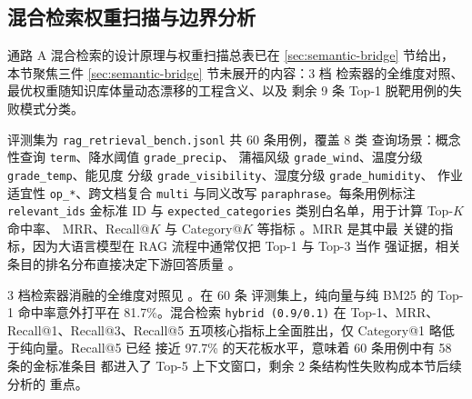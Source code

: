 ﻿%

\subsection{混合检索权重扫描与边界分析}
\label{sec:rag-eval}

通路 A 混合检索的设计原理与权重扫描总表已在 \ref{sec:semantic-bridge}
节给出，本节聚焦三件 \ref{sec:semantic-bridge} 节未展开的内容：3 档
检索器的全维度对照、最优权重随知识库体量动态漂移的工程含义、以及
剩余 9 条 Top-1 脱靶用例的失败模式分类。

评测集为 \texttt{rag\_\bk{}retrieval\_\bk{}bench.\bk{}jsonl} 共 60 条用例，覆盖 8 类
查询场景：概念性查询 \texttt{term}、降水阈值 \texttt{grade\_\bk{}precip}、
蒲福风级 \texttt{grade\_\bk{}wind}、温度分级 \texttt{grade\_\bk{}temp}、能见度
分级 \texttt{grade\_\bk{}visibility}、湿度分级 \texttt{grade\_\bk{}humidity}、
作业适宜性 \texttt{op\_\bk{}*}、跨文档复合 \texttt{multi} 与同义改写
\texttt{paraphrase}。每条用例标注 \texttt{relevant\_\bk{}ids} 金标准 ID
与 \texttt{expected\_\bk{}categories} 类别白名单，用于计算 Top-$K$ 命中率、
MRR、Recall@$K$ 与 Category@$K$ 等指标 \cite{ref24}。MRR 是其中最
关键的指标，因为大语言模型在 RAG 流程中通常仅把 Top-1 与 Top-3 当作
强证据，相关条目的排名分布直接决定下游回答质量 \cite{ref12}。

3 档检索器消融的全维度对照见 。在 60 条
评测集上，纯向量与纯 BM25 的 Top-1 命中率意外打平在 81.7\%。混合检索
\texttt{hybrid (0.9/\bk{}0.1)} 在 Top-1、MRR、Recall@1、Recall@3、Recall@5
五项核心指标上全面胜出，仅 Category@1 略低于纯向量。Recall@5 已经
接近 97.7\% 的天花板水平，意味着 60 条用例中有 58 条的金标准条目
都进入了 Top-5 上下文窗口，剩余 2 条结构性失败构成本节后续分析的
重点。

